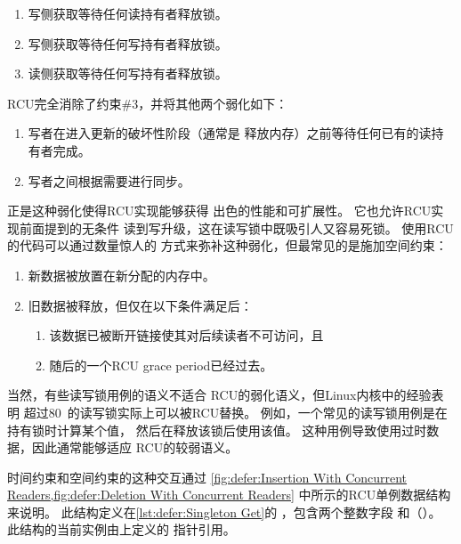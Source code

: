 \begin{enumerate}
\item	写侧获取等待任何读持有者释放锁。
\item	写侧获取等待任何写持有者释放锁。
\item	读侧获取等待任何写持有者释放锁。
\end{enumerate}

RCU完全消除了约束\#3，并将其他两个弱化如下：

\begin{enumerate}
\item	写者在进入更新的破坏性阶段（通常是
	释放内存）之前等待任何已有的读持有者完成。
\item	写者之间根据需要进行同步。
\end{enumerate}

正是这种弱化使得RCU实现能够获得
出色的性能和可扩展性。
它也允许RCU实现前面提到的无条件
读到写升级，这在读写锁中既吸引人又容易死锁。
使用RCU的代码可以通过数量惊人的
方式来弥补这种弱化，但最常见的是施加空间约束：

\begin{enumerate}
\item	新数据被放置在新分配的内存中。
\item	旧数据被释放，但仅在以下条件满足后：
	\begin{enumerate}
	\item	该数据已被断开链接使其对后续读者不可访问，且
	\item	随后的一个RCU grace period已经过去。
	\end{enumerate}
\end{enumerate}

当然，有些读写锁用例的语义不适合
RCU的弱化语义，但Linux内核中的经验表明
超过80\pct\ 的读写锁实际上可以被RCU替换。
例如，一个常见的读写锁用例是在持有锁时计算某个值，
然后在释放该锁后使用该值。
这种用例导致使用过时数据，因此通常能够适应
RCU的较弱语义。

\begin{listing}

\caption{RCU单例获取}
\label{lst:defer:Singleton Get}
\end{listing}

\begin{listing}

\caption{RCU单例设置}
\label{lst:defer:Singleton Set}
\end{listing}

\begin{fcvref}
时间约束和空间约束的这种交互通过
\cref{fig:defer:Insertion With Concurrent Readers,fig:defer:Deletion With Concurrent Readers}
中所示的RCU单例数据结构来说明。
此结构定义在\cref{lst:defer:Singleton Get}的
，包含两个整数字段
和（）。
此结构的当前实例由上定义的
指针引用。
\end{fcvref}

